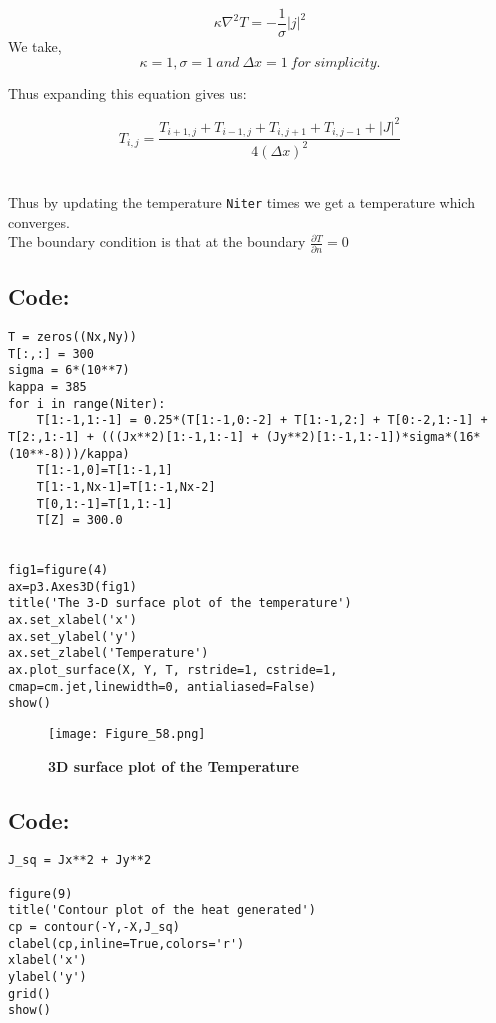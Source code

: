\documentclass[11pt, a4paper, twoside]{article}
\begin{document}
\begin{equation}
 \kappa \nabla^2{T}=-\frac{1}{\sigma} {|j|^2}   
\end{equation}
 We take,
 \begin{equation}
   \kappa=1,\sigma=1 \ and \ \Delta{x}=1  \ for \ simplicity. 
 \end{equation}

 Thus expanding this equation gives us:

\begin{equation}
 T_{i,j}= \frac{T_{i+1,j}+T_{i-1,j}+T_{i,j+1}+T_{i,j-1}+|J|^2}{4(\Delta{x})^2}  
\end{equation}

\\Thus by updating the temperature \texttt{Niter} times we get a
temperature which converges. \\The boundary condition is that at the
boundary \(\frac{\partial{T}}{\partial{n}}=0\)

\subsection*{Code:}
\begin{verbatim} 
T = zeros((Nx,Ny))
T[:,:] = 300
sigma = 6*(10**7)
kappa = 385
for i in range(Niter):
    T[1:-1,1:-1] = 0.25*(T[1:-1,0:-2] + T[1:-1,2:] + T[0:-2,1:-1] + T[2:,1:-1] + (((Jx**2)[1:-1,1:-1] + (Jy**2)[1:-1,1:-1])*sigma*(16*(10**-8)))/kappa)
    T[1:-1,0]=T[1:-1,1]
    T[1:-1,Nx-1]=T[1:-1,Nx-2]
    T[0,1:-1]=T[1,1:-1]
    T[Z] = 300.0


fig1=figure(4)
ax=p3.Axes3D(fig1)
title('The 3-D surface plot of the temperature')
ax.set_xlabel('x')
ax.set_ylabel('y')
ax.set_zlabel('Temperature')
ax.plot_surface(X, Y, T, rstride=1, cstride=1, cmap=cm.jet,linewidth=0, antialiased=False)
show()
\end{verbatim} 

 \begin{figure}[!tbh]
 \centering
 \texttt{[image: Figure\_58.png]}  
 \caption{\textbf{3D surface plot of the Temperature}}
 \end{figure}
   
   
\newpage
  
\subsection*{Code:}
\begin{verbatim}     
J_sq = Jx**2 + Jy**2

figure(9)
title('Contour plot of the heat generated')
cp = contour(-Y,-X,J_sq)
clabel(cp,inline=True,colors='r')
xlabel('x')
ylabel('y')
grid()
show()
\end{verbatim}
 
\end{document}
